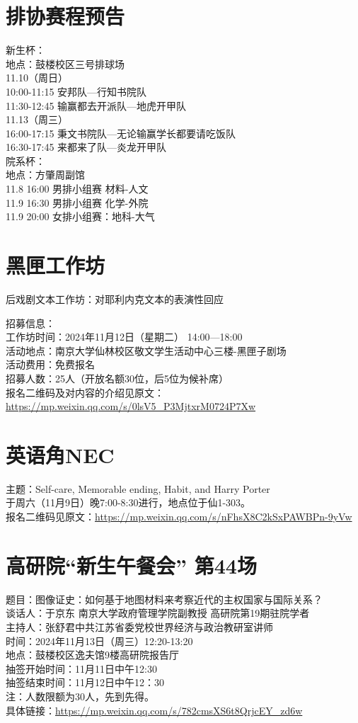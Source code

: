 \documentclass[letterpaper, 12pt]{article}
\begin{document}
\begin{multicols}{2}
\section{排协赛程预告}
新生杯：\\
地点：鼓楼校区三号排球场\\
11.10（周日）\\
10:00-11:15 安邦队—行知书院队\\
11:30-12:45 输赢都去开派队—地虎开甲队\\
11.13（周三）\\
16:00-17:15	秉文书院队—无论输赢学长都要请吃饭队\\
16:30-17:45 来都来了队—炎龙开甲队\\
院系杯：\\
地点：方肇周副馆\\
11.8 16:00 男排小组赛 材料-人文\\
11.9 16:30 男排小组赛 化学-外院\\
11.9 20:00 女排小组赛：地科-大气

\section{黑匣工作坊}
后戏剧文本工作坊：对耶利内克文本的表演性回应

招募信息：\\
工作坊时间：2024年11月12日（星期二） 14:00—18:00\\
活动地点：南京大学仙林校区敬文学生活动中心三楼-黑匣子剧场\\
活动费用：免费报名\\
招募人数：25人（开放名额30位，后5位为候补席）\\
报名二维码及对内容的介绍见原文：\url{https://mp.weixin.qq.com/s/0lsV5_P3MjtxrM0724P7Xw}


\section{英语角NEC}
主题：Self-care, Memorable ending, Habit, and Harry Porter\\
于周六（11月9日）晚7:00-8:30进行，地点位于仙1-303。\\
报名二维码见原文：\url{https://mp.weixin.qq.com/s/nFhsX8C2kSxPAWBPn-9yVw}

\section{高研院“新生午餐会” 第44场}
题目：图像证史：如何基于地图材料来考察近代的主权国家与国际关系？\\
谈话人：于京东 南京大学政府管理学院副教授 高研院第19期驻院学者\\
主持人：张舒君中共江苏省委党校世界经济与政治教研室讲师\\
时间：2024年11月13日（周三）12:20-13:20\\
地点：鼓楼校区逸夫馆9楼高研院报告厅\\
抽签开始时间：11月11日中午12:30\\
抽签结束时间：11月12日中午12：30\\
注：人数限额为30人，先到先得。\\
具体链接：\url{https://mp.weixin.qq.com/s/782cmsXS6t8QrjcEY_zd6w}


\end{multicols}
\end{document}
